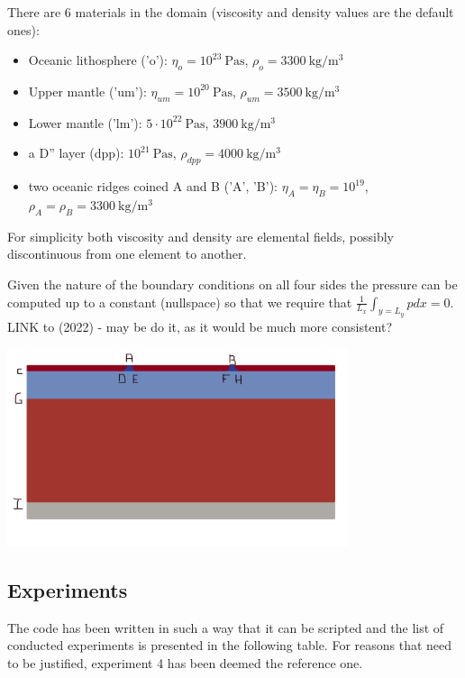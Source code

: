 There are 6 materials in the domain (viscosity and density values are the default ones):
\begin{itemize}
\item Oceanic lithosphere ('o'):  
$\eta_o=10^{23}~\si{\pascal\second}$, $\rho_o=3300~\si{\kg\per\cubic\meter}$
\item Upper mantle ('um'): 
$\eta_{um}=10^{20}~\si{\pascal\second}$, $\rho_{um}=3500~\si{\kg\per\cubic\meter}$
\item Lower mantle ('lm'): 
$5\cdot 10^{22}~\si{\pascal\second}$, $ 3900~\si{\kg\per\cubic\meter}$ 
\item a D'' layer (dpp): 
$10^{21}~\si{\pascal\second}$,   $\rho_{dpp}=4000~\si{\kg\per\cubic\meter}$
\item two oceanic ridges coined A and B ('A', 'B'): 
$\eta_A=\eta_B=10^{19}$, $\rho_A=\rho_B=3300~\si{\kg\per\cubic\meter}$
\end{itemize}
For simplicity both viscosity and density are elemental fields, possibly discontinuous from 
one element to another.

Given the nature of the boundary conditions on all four sides 
the pressure can be computed up to a constant (nullspace)
so that we require that $\frac{1}{L_x}\int_{y=L_y} p dx =0$.
LINK to \textcite{joma22} (2022) - may be do it, as it would be 
much more consistent?

\begin{center}
\includegraphics[width=10cm]{python_codes/fieldstone_148/images/setup}
\end{center}


\subsection*{Experiments}

The code has been written in such a 
way that it can be scripted and the list of conducted experiments is presented in the following 
table. For reasons that need to be justified, experiment 4 has been deemed the reference one.


